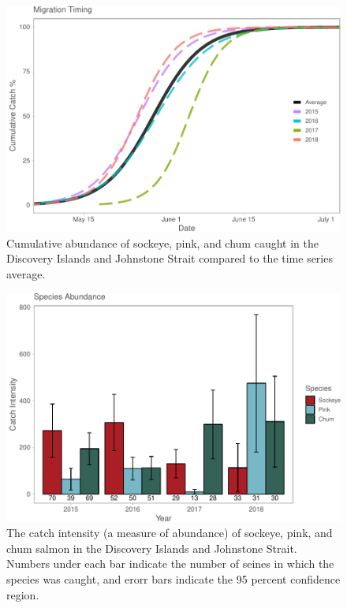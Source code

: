 \documentclass[fleqn,10pt]{wlpeerj} %
\begin{document}
\begin{figure}[H]
\includegraphics[width=0.9\linewidth]{Migration_Observations_Report_files/figure-latex/mt-1} \caption{Cumulative abundance of sockeye, pink, and chum caught in the Discovery Islands and Johnstone Strait compared to the time series average.}\label{fig:mt}
\end{figure}

\begin{figure}[H]
\includegraphics[width=0.9\linewidth]{Migration_Observations_Report_files/figure-latex/catchintensity-1} \caption{The catch intensity (a measure of abundance) of sockeye, pink, and chum salmon in the Discovery Islands and Johnstone Strait. Numbers under each bar indicate the number of seines in which the species was caught, and erorr bars indicate the 95 percent confidence region.}\label{fig:catchintensity}
\end{figure}
\end{document}
